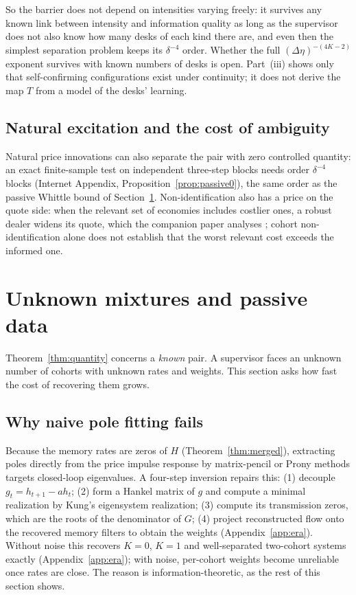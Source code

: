 \documentclass[12pt]{article}
\theoremstyle{definition}
\theoremstyle{remark}
\begin{document}
So the barrier does not depend on intensities varying freely: it survives any known link between intensity and information quality as long as the supervisor does not also know how many desks of each kind there are, and even then the simplest separation problem keeps its $\delta^{-4}$ order. Whether the full $(\Delta\eta)^{-(4K-2)}$ exponent survives with known numbers of desks is open. Part~(iii) shows only that self-confirming configurations exist under continuity; it does not derive the map $T$ from a model of the desks' learning.

\subsection{Natural excitation and the cost of ambiguity}

Natural price innovations can also separate the pair with zero controlled quantity: an exact finite-sample test on independent three-step blocks needs order $\delta^{-4}$ blocks (Internet Appendix, Proposition~\ref{prop:passive0}), the same order as the passive Whittle bound of Section~\ref{sec:mixtures}. Non-identification also has a price on the quote side: when the relevant set of economies includes costlier ones, a robust dealer widens its quote, which the companion paper analyses \citep{niroula2026b}; cohort non-identification alone does not establish that the worst relevant cost exceeds the informed one.
\section{Unknown mixtures and passive data}\label{sec:mixtures}

Theorem~\ref{thm:quantity} concerns a \emph{known} pair. A supervisor faces an unknown number of cohorts with unknown rates and weights. This section asks how fast the cost of recovering them grows.

\subsection{Why naive pole fitting fails}

Because the memory rates are zeros of $H$ (Theorem~\ref{thm:merged}), extracting poles directly from the price impulse response by matrix-pencil or Prony methods targets closed-loop eigenvalues. A four-step inversion repairs this: (1) decouple $g_t=h_{t+1}-ah_t$; (2) form a Hankel matrix of $g$ and compute a minimal realization by Kung's eigensystem realization; (3) compute its transmission zeros, which are the roots of the denominator of $G$; (4) project reconstructed flow onto the recovered memory filters to obtain the weights (Appendix~\ref{app:era}). Without noise this recovers $K=0$, $K=1$ and well-separated two-cohort systems exactly (Appendix~\ref{app:era}); with noise, per-cohort weights become unreliable once rates are close. The reason is information-theoretic, as the rest of this section shows.
\end{document}
